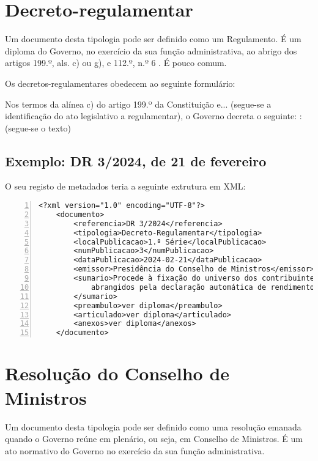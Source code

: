 \section{Decreto-regulamentar}

Um documento desta tipologia pode ser definido como um Regulamento. É um diploma do Governo, 
no exercício da sua função administrativa, ao abrigo dos artigos 199.º, als. c) ou g), e 
112.º, n.º 6 . É pouco comum.

Os decretos-regulamentares obedecem ao seguinte formulário:

\begin{quoting}
    Nos termos da alínea c) do artigo 199.º da Constituição e... 
    (segue-se a identificação do ato legislativo a regulamentar), 
    o Governo decreta o seguinte: : 
    (segue-se o texto)
\end{quoting}


\subsection{Exemplo: DR 3/2024, de 21 de fevereiro} 
    
O seu registo de metadados teria a seguinte extrutura em XML:
    
\begin{Verbatim}[frame=single, numbers=left, fontsize=\small, commandchars=\\\{\}]
<?xml version="1.0" encoding="UTF-8"?>
    <documento>
        <referencia>DR 3/2024</referencia>
        <tipologia>Decreto-Regulamentar</tipologia>
        <localPublicacao>1.ª Série</localPublicacao>
        <numPublicacao>3</numPublicacao>
        <dataPublicacao>2024-02-21</dataPublicacao>
        <emissor>Presidência do Conselho de Ministros</emissor>
        <sumario>Procede à fixação do universo dos contribuintes 
            abrangidos pela declaração automática de rendimentos.
        </sumario>
        <preambulo>ver diploma</preambulo>
        <articulado>ver diploma</articulado>
        <anexos>ver diploma</anexos>
    </documento>
\end{Verbatim}


\section{Resolução do Conselho de Ministros}

Um documento desta tipologia pode ser definido como uma resolução emanada quando 
o Governo reúne em plenário, ou seja, em Conselho de Ministros. 
É um ato normativo do Governo no exercício da sua função administrativa.

